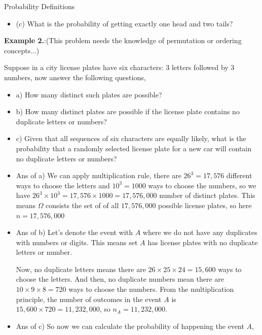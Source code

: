 \documentclass[8pt, usepdftitle = false]{beamer}
\newcounter{mytheorem}
\renewcommand{\themytheorem}{2.\arabic{mytheorem}}
\newcommand{\Thm}[1]{\refstepcounter{mytheorem}\textbf{#1\color{blue}\themytheorem}:}
\begin{document}
\begin{frame}[allowframebreaks]{Probability Definitions}
\begin{itemize}
\begin{itemize}
\item (c) What is the probability of getting exactly one head and two tails?
\end{itemize}

\framebreak

{\Thm{Example }(This problem needs the knowledge of permutation or ordering concepts...)}

Suppose in a city license plates have six characters: $3$ letters followed by $3$ numbers, now answer the following questions,

\medskip

\begin{itemize}
\item a) How many distinct such plates are possible?
\item  b) How many distinct plates are possible if the license plate contains no duplicate letters or numbers?
\item c) Given that all sequences of six characters are equally likely, what is the probability that a randomly selected license plate for a new car will contain no duplicate letters or numbers?
\end{itemize}


\vspace*{.3cm}

\begin{itemize}
\item Ans of a) We can apply multiplication rule, there are $26^3=17,576$ different ways to choose the letters and $10^3=1000$ ways to choose the numbers, so we have $26^3 \times 10^3 = 17,576 \times 1000=17,576,000$ number of distinct plates. This means $\Omega$ consists the set of of all $17,576,000$ possible license plates, so here $n = 17,576,000$

\medskip
\item Ans of b) Let's denote the event with $A$ where we do not have any duplicates with numbers or digits. This means set $A$ has license plates with no duplicate letters or number. 
\medskip

Now, no duplicate letters means there are $26 \times 25 \times 24 = 15,600$ ways to choose the letters. And then, no duplicate numbers mean there are $10 \times 9 \times 8=720$ ways to choose the numbers. From the multiplication principle, the number of outcomes in the event $A$ is $15,600 \times 720=11,232,000$, so $n_A = 11,232,000$.
\medskip
\item Ans of c) So now we can calculate the probability of happening the event $A$,


\end{itemize}
\end{itemize}
\end{frame}
\end{document}
